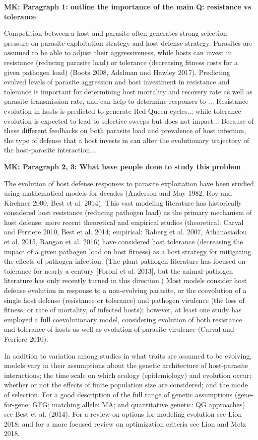 \documentclass{article}
\newcommand{\mk}[1]{{\bf \color{red} MK: #1}}
\begin{document}
\mk{Paragraph 1: outline the importance of the main Q: resistance vs tolerance}

Competition between a host and parasite often generates strong selection pressure on parasite exploitation strategy and host defense strategy. Parasites are assumed to be able to adjust their aggressiveness, while hosts can invest in resistance (reducing parasite load) or tolerance (decreasing fitness costs for a given pathogen load) (Boots 2008, Adelman and Hawley 2017). Predicting evolved levels of parasite aggression and host investment in resistance and tolerance is important for determining host mortality and recovery rate as well as parasite transmission rate, and can help to determine responses to ... Resistance evolution in hosts is predicted to generate Red Queen cycles... while tolerance evolution is expected to lead to selective sweeps but does not impact... Because of these different feedbacks on both parasite load and prevalence of host infection, the type of defense that a host invests in can alter the evolutionary trajectory of the host-parasite interaction...

\mk{Paragraph 2, 3: What have people done to study this problem}

The evolution of host defense responses to parasite exploitation have been studied using mathematical models for decades (Anderson and May 1982, Roy and Kirchner 2000, Best et al. 2014). This vast modeling literature has historically considered host resistance (reducing pathogen load) as the primary mechanism of host defense; more recent theoretical and empirical studies (theoretical: Carval and Ferriere 2010, Best et al. 2014; empirical: Raberg et al. 2007, Athanasiadou et al. 2015, Rangan et al. 2016) have considered host tolerance (decreasing the impact of a given pathogen load on host fitness) as a host strategy for mitigating the effects of pathogen infection. (The plant-pathogen literature has focused on tolerance for nearly a century [Foroni et al. 2013], but the animal-pathogen literature has only recently turned in this direction.) Most models consider host defense evolution in response to a non-evolving parasite, or the coevolution of a single host defense (resistance or tolerance) and pathogen virulence (the loss of fitness, or rate of mortality, of infected hosts); however, at least one study has employed a full coevolutionary model, considering evolution of both resistance and tolerance of hosts as well as evolution of parasite virulence (Carval and Ferriere 2010). 

In addition to variation among studies in what traits are assumed to be evolving, models vary in their assumptions about the genetic architecture of host-parasite interactions; the time scale on which ecology (epidemiology) and evolution occur; whether or not the effects of finite population size are considered; and the mode of selection. For a good description of the full range of genetic assumptions (gene-for-gene: GFG; matching allele: MA; and quantitative genetic: QG approaches) see Best et al. (2014). For a review on options for modeling evolution see Lion 2018; and for a more focused review on optimization criteria see Lion and Metz 2018.
\end{document}

